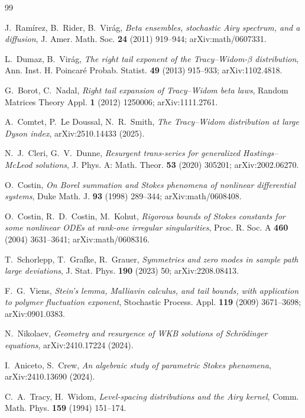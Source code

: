 \documentclass[11pt,reqno]{amsart}
\theoremstyle{plain}
\theoremstyle{definition}
\theoremstyle{remark}
\begin{document}
\begin{thebibliography}{99}

 J.~Ram\'irez, B.~Rider, B.~Vir\'ag, \emph{Beta ensembles, stochastic Airy spectrum,
and a diffusion}, J. Amer. Math. Soc. \textbf{24} (2011) 919--944; arXiv:math/0607331.

 L.~Dumaz, B.~Vir\'ag, \emph{The right tail exponent of the Tracy--Widom-$\beta$
distribution}, Ann. Inst. H. Poincar\'e Probab. Statist. \textbf{49} (2013) 915--933;
arXiv:1102.4818.

 G.~Borot, C.~Nadal, \emph{Right tail expansion of Tracy--Widom beta laws},
Random Matrices Theory Appl. \textbf{1} (2012) 1250006; arXiv:1111.2761.

 A.~Comtet, P.~Le Doussal, N.~R.~Smith, \emph{The Tracy--Widom distribution at large
Dyson index}, arXiv:2510.14433 (2025).

 N.~J.~Cleri, G.~V.~Dunne, \emph{Resurgent trans-series for generalized
Hastings--McLeod solutions}, J. Phys. A: Math. Theor. \textbf{53} (2020) 305201; arXiv:2002.06270.

 O.~Costin, \emph{On Borel summation and Stokes phenomena of nonlinear
differential systems}, Duke Math. J. \textbf{93} (1998) 289--344; arXiv:math/0608408.

 O.~Costin, R.~D.~Costin, M.~Kohut, \emph{Rigorous bounds of Stokes constants for some
nonlinear ODEs at rank-one irregular singularities}, Proc. R. Soc. A \textbf{460} (2004)
3631--3641; arXiv:math/0608316.

 T.~Schorlepp, T.~Grafke, R.~Grauer, \emph{Symmetries and zero modes in sample path
large deviations}, J. Stat. Phys. \textbf{190} (2023) 50; arXiv:2208.08413.

 F.~G.~Viens, \emph{Stein's lemma, Malliavin calculus, and tail bounds, with
application to polymer fluctuation exponent}, Stochastic Process. Appl. \textbf{119} (2009)
3671--3698; arXiv:0901.0383.

 N.~Nikolaev, \emph{Geometry and resurgence of WKB solutions of Schr\"odinger
equations}, arXiv:2410.17224 (2024).

 I.~Aniceto, S.~Crew, \emph{An algebraic study of parametric Stokes
phenomena}, arXiv:2410.13690 (2024).

 C.~A.~Tracy, H.~Widom, \emph{Level-spacing distributions and the Airy kernel},
Comm. Math. Phys. \textbf{159} (1994) 151--174.


\end{thebibliography}
\end{document}
